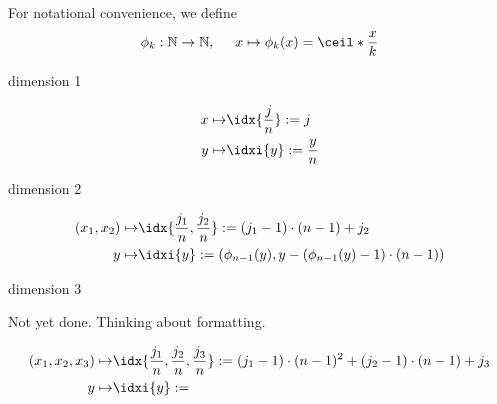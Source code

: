 For notational convenience, we define
\begin{align*}
    \phi_k : \mathbb{N} \rightarrow \mathbb{N}, \hspace{0.5cm}
    x \mapsto \phi_k (x) = \ceil*{\frac{x}{k}}
\end{align*}

dimension 1

\begin{align*}
    x \mapsto& \idx{\frac{j}{n}} := j \\
    y \mapsto& \idxi{y} := \frac{y}{n}
\end{align*}

dimension 2

\begin{align*}
    (x_1, x_2) \mapsto& \idx{\frac{j_1}{n}, \frac{j_2}{n}}
    := (j_1 - 1) \cdot (n - 1) + j_2 \\
    y \mapsto& \idxi{y} := \left( \phi_{n-1}(y),
    y - \left( \phi_{n-1}(y) - 1 \right) \cdot (n - 1) \right)
\end{align*}

dimension 3

Not yet done. Thinking about formatting.

\begin{align*}
    (x_1, x_2, x_3) \mapsto& \idx{\frac{j_1}{n}, \frac{j_2}{n}, \frac{j_3}{n}}
    := (j_1 - 1) \cdot (n - 1)^2 + (j_2 - 1) \cdot (n - 1) + j_3 \\
    y \mapsto& \idxi{y} := 
\end{align*}

